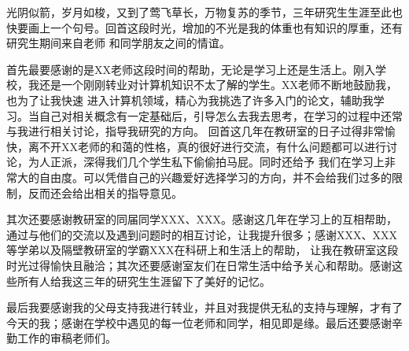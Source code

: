 
\thesisacknowledgement
光阴似箭，岁月如梭，又到了莺飞草长，万物复苏的季节，三年研究生生涯至此也快要画上一个句号。回首这段时光，增加的不光是我的体重也有知识的厚重，还有研究生期间来自老师
和同学朋友之间的情谊。

首先最要感谢的是XX老师这段时间的帮助，无论是学习上还是生活上。刚入学校，我还是一个刚刚转业对计算机知识不太了解的学生。XX老师不断地鼓励我，也为了让我快速
进入计算机领域，精心为我挑选了许多入门的论文，辅助我学习。当自己对相关概念有一定基础后，引导怎么去我去思考，在学习的过程中还常与我进行相关讨论，指导我研究的方向。
回首这几年在教研室的日子过得非常愉快，离不开XX老师的和蔼的性格，真的很好进行交流，有什么问题都可以进行讨论，为人正派，深得我们几个学生私下偷偷拍马屁。同时还给予
我们在学习上非常大的自由度。可以凭借自己的兴趣爱好选择学习的方向，并不会给我们过多的限制，反而还会给出相关的指导意见。

其次还要感谢教研室的同届同学XXX、XXX。感谢这几年在学习上的互相帮助，通过与他们的交流以及遇到问题时的相互讨论，让我提升很多；感谢XXX、XXX等学弟以及隔壁教研室的学霸XXX在科研上和生活上的帮助，
让我在教研室这段时光过得愉快且融洽；其次还要感谢室友们在日常生活中给予关心和帮助。感谢这些所有人给我这三年的研究生生涯留下了美好的记忆。

最后我要感谢我的父母支持我进行转业，并且对我提供无私的支持与理解，才有了今天的我；感谢在学校中遇见的每一位老师和同学，相见即是缘。最后还要感谢辛勤工作的审稿老师们。
